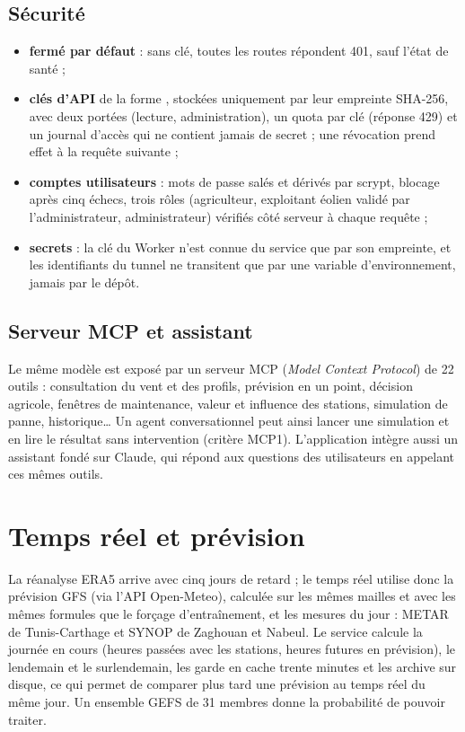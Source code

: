 \subsection{Sécurité}
\begin{itemize}
  \item \textbf{fermé par défaut} : sans clé, toutes les routes répondent 401, sauf l'état de santé ;
  \item \textbf{clés d'API} de la forme , stockées uniquement par leur
        empreinte SHA-256, avec deux portées (lecture, administration), un quota par clé (réponse
        429) et un journal d'accès qui ne contient jamais de secret ; une révocation prend effet à la
        requête suivante ;
  \item \textbf{comptes utilisateurs} : mots de passe salés et dérivés par scrypt, blocage après
        cinq échecs, trois rôles (agriculteur, exploitant éolien validé par l'administrateur,
        administrateur) vérifiés côté serveur à chaque requête ;
  \item \textbf{secrets} : la clé du Worker n'est connue du service que par son empreinte, et les
        identifiants du tunnel ne transitent que par une variable d'environnement, jamais par le
        dépôt.
\end{itemize}

\subsection{Serveur MCP et assistant}
Le même modèle est exposé par un serveur MCP (\emph{Model Context Protocol}) de 22 outils :
consultation du vent et des profils, prévision en un point, décision agricole, fenêtres de
maintenance, valeur et influence des stations, simulation de panne, historique\dots{} Un agent
conversationnel peut ainsi lancer une simulation et en lire le résultat sans intervention (critère
MCP1). L'application intègre aussi un assistant fondé sur Claude, qui répond aux questions des
utilisateurs en appelant ces mêmes outils.

\section{Temps réel et prévision}
La réanalyse ERA5 arrive avec cinq jours de retard ; le temps réel utilise donc la prévision GFS
(via l'API Open-Meteo), calculée sur les mêmes mailles et avec les mêmes formules que le forçage
d'entraînement, et les mesures du jour : METAR de Tunis-Carthage et SYNOP de Zaghouan et Nabeul.
Le service calcule la journée en cours (heures passées avec les stations, heures futures en
prévision), le lendemain et le surlendemain, les garde en cache trente minutes et les archive sur
disque, ce qui permet de comparer plus tard une prévision au temps réel du même jour. Un ensemble
GEFS de 31 membres donne la probabilité de pouvoir traiter.

